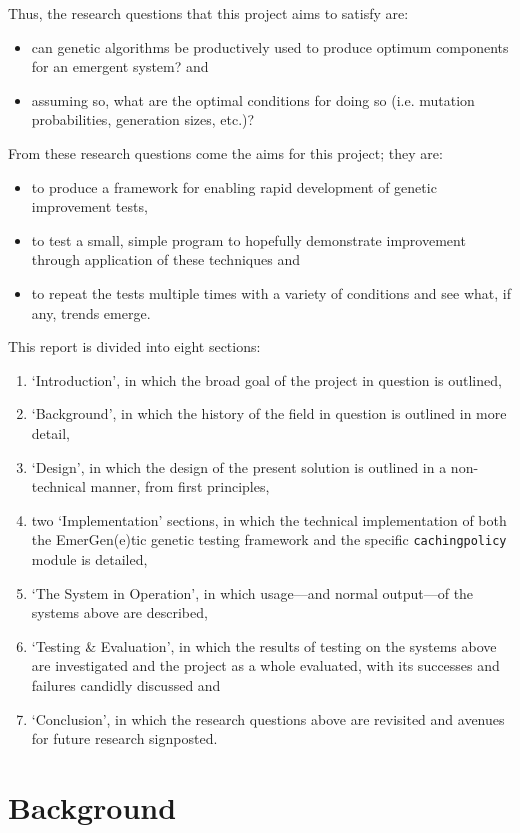 \documentclass[compsoc,12pt,a4paper]{IEEEtran}
\begin{document}
		Thus, the research questions that this project aims to satisfy are:
		\begin{itemize}
			\item can genetic algorithms be productively used to produce optimum components for an emergent system? and
			\item assuming so, what are the optimal conditions for doing so (i.e. mutation probabilities, generation sizes, etc.)?
		\end{itemize}
		From these research questions come the aims for this project; they are:
		\begin{itemize}
			\item to produce a framework for enabling rapid development of genetic improvement tests,
			\item to test a small, simple program to hopefully demonstrate improvement through application of these techniques and
			\item to repeat the tests multiple times with a variety of conditions and see what, if any, trends emerge.
		\end{itemize}
		This report is divided into eight sections:
		\begin{enumerate}
			\item `Introduction', in which the broad goal of the project in question is outlined,
			\item `Background', in which the history of the field in question is outlined in more detail,
			\item `Design', in which the design of the present solution is outlined in a non-technical manner, from first principles,
			\item two `Implementation' sections, in which the technical implementation of both the EmerGen(e)tic genetic testing framework and the specific \lstinline|cachingpolicy| module is detailed,
			\item `The System in Operation', in which usage---and normal output---of the systems above are described,
			\item `Testing \& Evaluation', in which the results of testing on the systems above are investigated and the project as a whole evaluated, with its successes and failures candidly discussed and
			\item `Conclusion', in which the research questions above are revisited and avenues for future research signposted.
		\end{enumerate}

	\newpage
	
	\section{Background}
	\label{sec:background}
	
\end{document}
